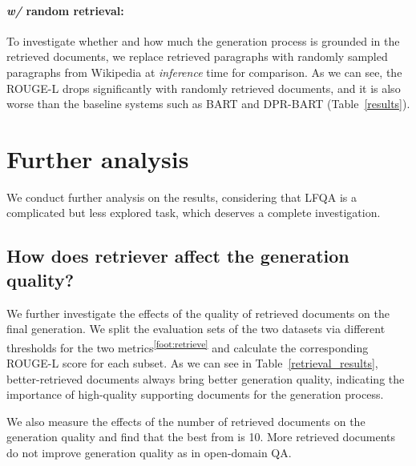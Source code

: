 \documentclass[11pt]{article}
\begin{document}
\paragraph{\textit{w/} random retrieval:} To investigate whether and how much the generation process is grounded in the retrieved documents, we replace retrieved paragraphs with randomly sampled paragraphs from Wikipedia at \textit{inference} time for comparison. As we can see, the ROUGE-L drops significantly with randomly retrieved documents, and it is also worse than the baseline systems such as BART and DPR-BART (Table~\ref{results}).

\vspace{-5pt}
\section{Further analysis} 
\vspace{-5pt}
\label{sec:further}
We conduct further analysis on the results, considering that LFQA is a complicated but less explored task, which deserves a complete investigation. 
\vspace{-5pt}
\subsection{How does retriever affect the generation quality?}
\vspace{-3pt}
We further investigate the effects of the quality of retrieved documents on the final generation. We split the evaluation sets of the two datasets via different thresholds for the two metrics\textsuperscript{\ref{foot:retrieve}} and calculate the corresponding ROUGE-L score for each subset. As we can see in Table~\ref{retrieval_results}, better-retrieved documents always bring better generation quality, indicating the importance of high-quality supporting documents for the generation process.

We also measure the effects of the number of retrieved documents  on the generation quality and find that the best  from  is 10. More retrieved documents do not improve generation quality as in open-domain QA.
\end{document}
